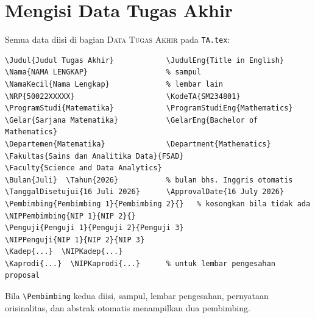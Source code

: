 \documentclass[11pt,a4paper]{article}
\newcommand{\cmd}[1]{\texttt{\textbackslash #1}}
\newcommand{\file}[1]{\texttt{#1}}
\begin{document}
\section{Mengisi Data Tugas Akhir}
Semua data diisi di bagian \textsc{Data Tugas Akhir} pada \file{TA.tex}:
\begin{lstlisting}
\Judul{Judul Tugas Akhir}            \JudulEng{Title in English}
\Nama{NAMA LENGKAP}                  % sampul
\NamaKecil{Nama Lengkap}             % lembar lain
\NRP{50022XXXXX}                     \KodeTA{SM234801}
\ProgramStudi{Matematika}            \ProgramStudiEng{Mathematics}
\Gelar{Sarjana Matematika}           \GelarEng{Bachelor of Mathematics}
\Departemen{Matematika}              \Department{Mathematics}
\Fakultas{Sains dan Analitika Data}{FSAD}
\Faculty{Science and Data Analytics}
\Bulan{Juli}  \Tahun{2026}           % bulan bhs. Inggris otomatis
\TanggalDisetujui{16 Juli 2026}      \ApprovalDate{16 July 2026}
\Pembimbing{Pembimbing 1}{Pembimbing 2}{}   % kosongkan bila tidak ada
\NIPPembimbing{NIP 1}{NIP 2}{}
\Penguji{Penguji 1}{Penguji 2}{Penguji 3}
\NIPPenguji{NIP 1}{NIP 2}{NIP 3}
\Kadep{...}  \NIPKadep{...}
\Kaprodi{...}  \NIPKaprodi{...}      % untuk lembar pengesahan proposal
\end{lstlisting}
Bila \cmd{Pembimbing} kedua diisi, sampul, lembar pengesahan, pernyataan orisinalitas, dan abstrak otomatis menampilkan dua pembimbing.

\end{document}
